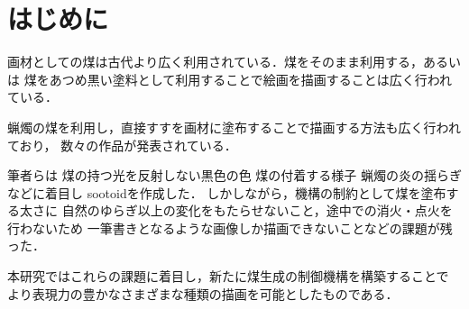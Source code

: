 \section{はじめに}

画材としての煤は古代より広く利用されている．煤をそのまま利用する，あるいは
煤をあつめ黒い塗料として利用することで絵画を描画することは広く行われている．

蝋燭の煤を利用し，直接すすを画材に塗布することで描画する方法も広く行われており，
数々の作品が発表されている．

筆者らは
煤の持つ光を反射しない黒色の色
煤の付着する様子
蝋燭の炎の揺らぎ
などに着目し sootoid\cite{sootid}を作成した．
しかしながら，機構の制約として煤を塗布する太さに
自然のゆらぎ以上の変化をもたらせないこと，途中での消火・点火を行わないため
一筆書きとなるような画像しか描画できないことなどの課題が残った．

本研究ではこれらの課題に着目し，新たに煤生成の制御機構を構築することで
より表現力の豊かなさまざまな種類の描画を可能としたものである．


